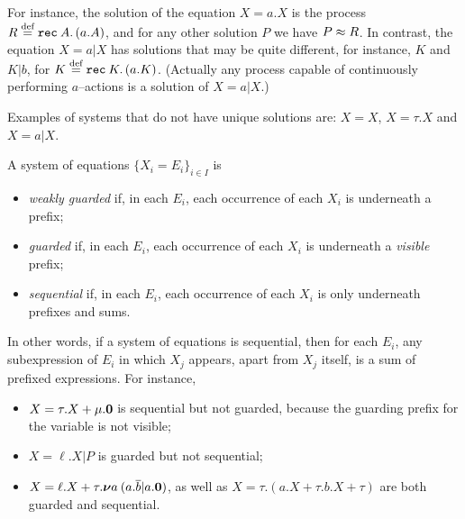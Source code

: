 For instance, the solution of the equation $X = a. X$ 
is the process
$R \stackrel{\mbox{\scriptsize def}}{=} {\tt rec}\: A . \, (a. A)$, and for any other solution $P$ we have $P \approx R$.
In contrast, the equation 
 $X = a|  X$ has solutions that may be quite different, for instance,
 $K$ and $K | b$, for $K \stackrel{\mbox{\scriptsize def}}{=} {\tt rec}\: K . \, (a. K)$. (Actually any process capable of
continuously performing $a$--actions is a solution of $X = a|  X$.)

%
%
Examples of systems that do not have unique solutions are: $X = X$, $X
= \tau . X$ and $X = a | X$.

\begin{definition}
\label{def:guardness}
A system of equations $\{ X_i = E_i\}_{i\in I}$ is 
\begin{itemize}
\item \emph{weakly guarded} if, in each $E_i$, each occurrence of
  each $X_i$ is underneath a prefix;

\item \emph{guarded} if, in each $E_i$, each occurrence of
  each $X_i$ is underneath a \emph{visible} prefix;

\item \emph{sequential} if, in each $E_i$, each
  occurrence of each $X_i$ is only underneath prefixes and sums.
\end{itemize}
\end{definition}

In other words, if a system of equations is sequential, then for
each  $E_i$, any subexpression of $E_i$ in which $X_j $
appears, apart from $X_j$ itself, is a sum of prefixed expressions.
For instance,
\begin{itemize}
\item $X = \tau. X + \mu . {\boldsymbol 0}$ is sequential but not 
 guarded, because the guarding prefix for the variable
is not visible;
\item $X =  \ell . X | P$ is guarded but not sequential;
\item $X =  \ell . X + \tau. {\boldsymbol \nu} a\: (a .\overline{b} | a.{\boldsymbol 0})$, as well as
$X = \tau . (a. X + \tau . b .X + \tau  )$ are both guarded and sequential.
\end{itemize}

